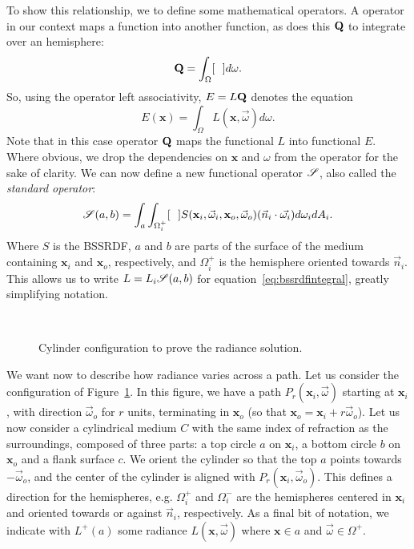 To show this relationship, we to define some mathematical operators. A operator in our context maps a function into another function, as does this  $\mathbf{Q}$ to integrate over an hemisphere:
\begin{equation*}
\mathbf{Q} = \int_\Omega [\ \ ] d\omega.
\end{equation*}
So, using the operator left associativity, $E = L\mathbf{Q}$ denotes the equation
\begin{equation*}
E(\mathbf{x}) = \int_\Omega L(\mathbf{x}, \vec{\omega}) d\omega.
\end{equation*}
Note that in this case operator $\mathbf{Q}$ maps the functional $L$ into functional $E$.
Where obvious, we drop the dependencies on $\mathbf{x}$ and $\omega$ from the operator for the sake of clarity. We can now define a new functional operator $\mathscr{S}$, also called the \emph{standard operator}:
\begin{equation*}
\mathscr{S}(a,b) = \int_a \int_{\Omega_i^+} [\ \ ] S(\mathbf{x}_i, \vec{\omega}_i, \mathbf{x}_o, \vec{\omega}_o) (\vec{n}_i \cdot \vec{\omega_i}) d \omega_i d A_i.
\end{equation*}
Where $S$ is the BSSRDF, $a$ and $b$ are parts of the surface of the medium containing $\mathbf{x}_i$ and $\mathbf{x}_o$, respectively, and $\Omega_i^+$ is the hemisphere oriented towards $\vec{n}_i$. This allows us to write $L = L_i \mathscr{S}(a,b)$ for equation~\ref{eq:bssrdfintegral}, greatly simplifying notation.
%
\begin{figure}
\centering
   \def\svgwidth{0.8\textwidth}
    \\
\caption{Cylinder configuration to prove the radiance solution.} %
\label{fig:cylinder}
\end{figure}
%
We want now to describe how radiance varies across a path. Let us consider the configuration of Figure~\ref{fig:cylinder}. In this figure, we have a path $P_r(\mathbf{x}_i,\vec{\omega})$ starting at $\mathbf{x}_i$, with direction $\vec{\omega}_o$ for $r$ units, terminating in $\mathbf{x}_o$ (so that $\mathbf{x}_o = \mathbf{x}_i + r \vec{\omega}_o$). Let us now consider a cylindrical medium $C$ with the same index of refraction as the surroundings, composed of three parts: a top circle $a$ on $\mathbf{x}_i$, a bottom circle $b$ on $\mathbf{x}_o$ and a flank surface $c$. We orient the cylinder so that the top $a$  points towards $-\vec{\omega}_o$, and the center of the cylinder is aligned with $P_r(\mathbf{x}_i,\vec{\omega}_o)$. This defines a direction for the hemispheres, e.g. $\Omega_i^+$ and $\Omega_i^-$ are the hemispheres centered in $\mathbf{x}_i$  and oriented towards or against $\vec{n}_i$, respectively. As a final bit of notation, we indicate with $L^+(a)$ some radiance $L(\mathbf{x}, \vec{\omega})$ where $\mathbf{x} \in a$ and $\vec{\omega} \in \Omega^+$.

